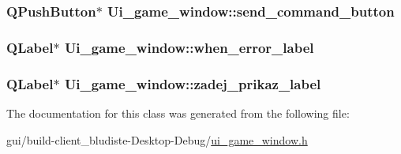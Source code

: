 \hypertarget{classUi__game__window_aef389fef0c6667e488d979c2ba461237}{
\subsubsection[{send\-\_\-command\-\_\-button}]{\setlength{\rightskip}{0pt plus 5cm}Q\-Push\-Button$\ast$ Ui\-\_\-game\-\_\-window\-::send\-\_\-command\-\_\-button}}\label{classUi__game__window_aef389fef0c6667e488d979c2ba461237}
\hypertarget{classUi__game__window_a8b1b310fc381161f44c720fa8ea3c4d6}{
\subsubsection[{when\-\_\-error\-\_\-label}]{\setlength{\rightskip}{0pt plus 5cm}Q\-Label$\ast$ Ui\-\_\-game\-\_\-window\-::when\-\_\-error\-\_\-label}}\label{classUi__game__window_a8b1b310fc381161f44c720fa8ea3c4d6}
\hypertarget{classUi__game__window_a309b06ba0af4527d2e78f91d03bc08d4}{
\subsubsection[{zadej\-\_\-prikaz\-\_\-label}]{\setlength{\rightskip}{0pt plus 5cm}Q\-Label$\ast$ Ui\-\_\-game\-\_\-window\-::zadej\-\_\-prikaz\-\_\-label}}\label{classUi__game__window_a309b06ba0af4527d2e78f91d03bc08d4}


The documentation for this class was generated from the following file\-:\begin{DoxyCompactItemize}
\item 
gui/build-\/client\-\_\-bludiste-\/\-Desktop-\/\-Debug/\hyperlink{ui__game__window_8h}{ui\-\_\-game\-\_\-window.\-h}\end{DoxyCompactItemize}
